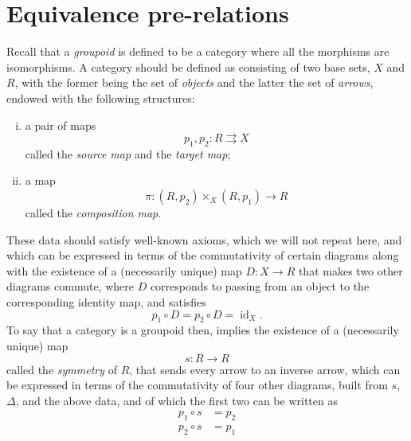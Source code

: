 \section{Equivalence pre-relations}\label{fga3.iii-4}

Recall that a \emph{groupoid} is defined to be a category where all the morphisms are isomorphisms.
A category should be defined as consisting of two base sets, $X$ and $R$, with the former being the set of \emph{objects} and the latter the set of \emph{arrows}, endowed with the following structures:

\begin{enumerate}[i.]
    \item a pair of maps
          \[
              p_1,p_2\colon R\rightrightarrows X
          \]
          called the \emph{source map} and the \emph{target map};
    \item a map
          \[
              \pi\colon(R,p_2)\times_X(R,p_1) \to R
          \]
          called the \emph{composition map}.
\end{enumerate}

These data should satisfy well-known axioms, which we will not repeat here, and which can be expressed in terms of the commutativity of certain diagrams along with the existence of a (necessarily unique) map $D\colon X\to R$ that makes two other diagrams commute, where $D$ corresponds to passing from an object to the corresponding identity map, and satisfies
\[
    p_1\circ D = p_2\circ D = \operatorname{id}_X.
\]
To say that a category is a groupoid then, implies the existence of a (necessarily unique) map
\[
    s\colon R\to R
\]
called the \emph{symmetry} of $R$, that sends every arrow to an inverse arrow, which can be expressed in terms of the commutativity of four other diagrams, built from $s$, $\Delta$, and the above data, and of which the first two can be written as
\[
    \begin{aligned}
        p_1\circ s & = p_2\\
        p_2\circ s &= p_1
    \end{aligned}
\]

